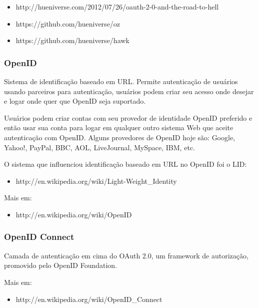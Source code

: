 \documentclass[11pt]{article}
\begin{document}
\begin{itemize}
  \item{http://hueniverse.com/2012/07/26/oauth-2-0-and-the-road-to-hell}
  \item{https://github.com/hueniverse/oz}
  \item{https://github.com/hueniverse/hawk}
\end{itemize}

\subsubsection{OpenID}

Sistema de identificação baseado em URL. Permite autenticação de usuários
usando parceiros para autenticação, usuários podem criar seu acesso onde
desejar e logar onde quer que OpenID seja suportado.

Usuários podem criar contas com seu provedor de identidade OpenID preferido e
então usar sua conta para logar em qualquer outro sistema Web que aceite
autenticação com OpenID. Alguns provedores de OpenID hoje são: Google, Yahoo!,
PayPal, BBC, AOL, LiveJournal, MySpace, IBM, etc.

O sistema que influenciou identificação baseado em URL no OpenID foi o LID:

\begin{itemize}
  \item{http://en.wikipedia.org/wiki/Light-Weight\_Identity}
\end{itemize}

Mais em:
\begin{itemize}
  \item{http://en.wikipedia.org/wiki/OpenID}
\end{itemize}

\subsubsection{OpenID Connect}

Camada de autenticação em cima do OAuth 2.0, um framework de autorização,
promovido pelo OpenID Foundation.

Mais em:
\begin{itemize}
  \item{http://en.wikipedia.org/wiki/OpenID\_Connect}
\end{itemize}
\end{document}
